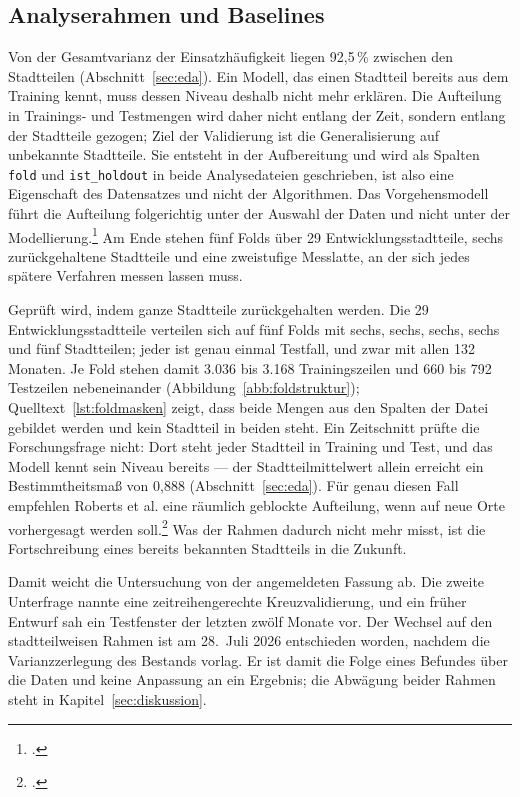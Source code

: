
\subsection{Analyserahmen und Baselines}
\label{sec:rahmen-baselines}

Von der Gesamtvarianz der Einsatzhäufigkeit liegen 92,5\,\% zwischen den
Stadtteilen (Abschnitt~\ref{sec:eda}). Ein Modell, das einen Stadtteil bereits
aus dem Training kennt, muss dessen Niveau deshalb nicht mehr erklären. Die
Aufteilung in Trainings- und Testmengen wird daher nicht entlang der Zeit,
sondern entlang der Stadtteile gezogen; Ziel der Validierung ist die
Generalisierung auf unbekannte Stadtteile. Sie entsteht in der Aufbereitung und
wird als Spalten \texttt{fold} und \texttt{ist\_holdout} in beide
Analysedateien geschrieben, ist also eine Eigenschaft des Datensatzes und nicht
der Algorithmen. Das Vorgehensmodell führt die Aufteilung folgerichtig unter
der Auswahl der Daten und nicht unter der
Modellierung.\footcite[23-26]{Chapman2000} Am Ende stehen fünf Folds über 29
Entwicklungsstadtteile, sechs zurückgehaltene Stadtteile und eine zweistufige
Messlatte, an der sich jedes spätere Verfahren messen lassen muss.

Geprüft wird, indem ganze Stadtteile zurückgehalten werden. Die 29
Entwicklungsstadtteile verteilen sich auf fünf Folds mit sechs, sechs, sechs,
sechs und fünf Stadtteilen; jeder ist genau einmal Testfall, und zwar mit allen
132 Monaten. Je Fold stehen damit 3.036 bis 3.168 Trainingszeilen und 660 bis 792
Testzeilen nebeneinander (Abbildung~\ref{abb:foldstruktur});
Quelltext~\ref{lst:foldmasken} zeigt, dass beide Mengen aus den Spalten der
Datei gebildet werden und kein Stadtteil in beiden steht. Ein Zeitschnitt
prüfte die Forschungsfrage nicht: Dort steht jeder Stadtteil in Training und
Test, und das Modell kennt sein Niveau bereits --- der Stadtteilmittelwert
allein erreicht ein Bestimmtheitsmaß von 0,888 (Abschnitt~\ref{sec:eda}). Für
genau diesen Fall empfehlen Roberts et al. eine räumlich geblockte Aufteilung,
wenn auf neue Orte vorhergesagt werden soll.\footcite[925]{Roberts2017} Was der
Rahmen dadurch nicht mehr misst, ist die Fortschreibung eines bereits bekannten
Stadtteils in die Zukunft.

Damit weicht die Untersuchung von der angemeldeten Fassung ab. Die zweite
Unterfrage nannte eine zeitreihengerechte Kreuzvalidierung, und ein früher
Entwurf sah ein Testfenster der letzten zwölf Monate vor. Der Wechsel auf den
stadtteilweisen Rahmen ist am 28.~Juli 2026 entschieden worden, nachdem die
Varianzzerlegung des Bestands vorlag. Er ist damit die Folge eines Befundes
über die Daten und keine Anpassung an ein Ergebnis; die Abwägung beider Rahmen
steht in Kapitel~\ref{sec:diskussion}.


